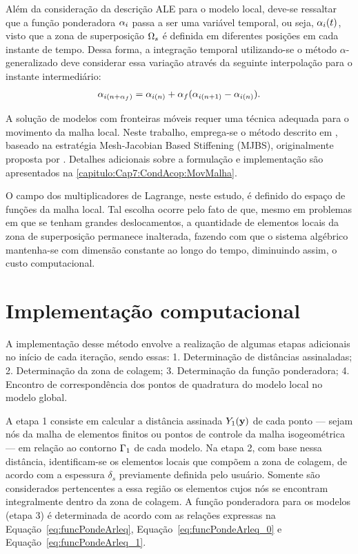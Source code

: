 Além da consideração da descrição ALE para o modelo local, deve-se ressaltar que a função ponderadora $\alpha_i$ passa a ser uma variável temporal, ou seja, $\alpha_i(t)$, visto que a zona de superposição $\Omega_s$ é definida em diferentes posições em cada instante de tempo. Dessa forma, a integração temporal utilizando-se o método $\alpha$-generalizado deve considerar essa variação através da seguinte interpolação para o instante intermediário:
\begin{align}
	\alpha_{i(n+\alpha_f)} = \alpha_{i(n)} + \alpha_f(\alpha_{i(n+1)} - \alpha_{i(n)}).
\end{align}

A solução de modelos com fronteiras móveis requer uma técnica adequada para o movimento da malha local. Neste trabalho, emprega-se o método descrito em , baseado na estratégia Mesh-Jacobian Based Stiffening (MJBS), originalmente proposta por . Detalhes adicionais sobre a formulação e implementação são apresentados na \autoref{capitulo:Cap7:CondAcop:MovMalha}.

O campo dos multiplicadores de Lagrange, neste estudo, é definido do espaço de funções da malha local. Tal escolha ocorre pelo fato de que, mesmo em problemas em que se tenham grandes deslocamentos, a quantidade de elementos locais da zona de superposição permanece inalterada, fazendo com que o sistema algébrico mantenha-se com dimensão constante ao longo do tempo, diminuindo assim, o custo computacional. 

\section{Implementação computacional}

A implementação desse método envolve a realização de algumas etapas adicionais no início de cada iteração, sendo essas: 1. Determinação de distâncias assinaladas; 2. Determinação da zona de colagem;  3. Determinação da função ponderadora; 4. Encontro de correspondência dos pontos de quadratura do modelo local no modelo global.

A etapa 1 consiste em calcular a distância assinada $Y_1(\mathbf{y})$ de cada ponto — sejam nós da malha de elementos finitos ou pontos de controle da malha isogeométrica — em relação ao contorno $\Gamma_1$ de cada modelo.
Na etapa 2, com base nessa distância, identificam-se os elementos locais que compõem a zona de colagem, de acordo com a espessura $\delta_s$ previamente definida pelo usuário. Somente são considerados pertencentes a essa região os elementos cujos nós se encontram integralmente dentro da zona de colagem. A função ponderadora para os modelos (etapa 3) é  determinada de acordo com as relações expressas na Equação~\eqref{eq:funcPondeArleq}, Equação~\eqref{eq:funcPondeArleq_0} e Equação~\eqref{eq:funcPondeArleq_1}. 

